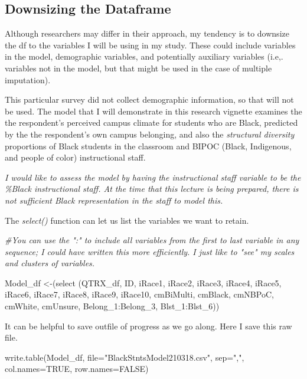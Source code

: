 \documentclass[
  english,
]{book}
\newenvironment{Shaded}{\begin{snugshade}}{\end{snugshade}}
\newcommand{\AttributeTok}[1]{\textcolor[rgb]{0.77,0.63,0.00}{#1}}
\newcommand{\CommentTok}[1]{\textcolor[rgb]{0.56,0.35,0.01}{\textit{#1}}}
\newcommand{\ConstantTok}[1]{\textcolor[rgb]{0.00,0.00,0.00}{#1}}
\newcommand{\FunctionTok}[1]{\textcolor[rgb]{0.00,0.00,0.00}{#1}}
\newcommand{\NormalTok}[1]{#1}
\newcommand{\OtherTok}[1]{\textcolor[rgb]{0.56,0.35,0.01}{#1}}
\newcommand{\SpecialCharTok}[1]{\textcolor[rgb]{0.00,0.00,0.00}{#1}}
\newcommand{\StringTok}[1]{\textcolor[rgb]{0.31,0.60,0.02}{#1}}
\begin{document}
\hypertarget{downsizing-the-dataframe}{%
\subsection{Downsizing the Dataframe}\label{downsizing-the-dataframe}}

Although researchers may differ in their approach, my tendency is to downsize the df to the variables I will be using in my study. These could include variables in the model, demographic variables, and potentially auxiliary variables (i.e,. variables not in the model, but that might be used in the case of multiple imputation).

This particular survey did not collect demographic information, so that will not be used. The model that I will demonstrate in this research vignette examines the the respondent's perceived campus climate for students who are Black, predicted by the the respondent's own campus belonging, and also the \emph{structural diversity} \citep{lewis_black_2019} proportions of Black students in the classroom and BIPOC (Black, Indigenous, and people of color) instructional staff.

\emph{I would like to assess the model by having the instructional staff variable to be the \%Black instructional staff. At the time that this lecture is being prepared, there is not sufficient Black representation in the staff to model this.}

The \emph{select()} function can let us list the variables we want to retain.

\begin{Shaded}
\begin{Highlighting}[]
\CommentTok{\#You can use the ":" to include all variables from the first to last variable in any sequence; I could have written this more efficiently.  I just like to "see" my scales and clusters of variables.}

\NormalTok{Model\_df }\OtherTok{\textless{}{-}}\NormalTok{(}\FunctionTok{select}\NormalTok{ (QTRX\_df, ID, iRace1, iRace2, iRace3, iRace4, iRace5, iRace6, iRace7, iRace8, iRace9, iRace10, cmBiMulti, cmBlack, cmNBPoC, cmWhite, cmUnsure, Belong\_1}\SpecialCharTok{:}\NormalTok{Belong\_3, Blst\_1}\SpecialCharTok{:}\NormalTok{Blst\_6))}
\end{Highlighting}
\end{Shaded}

It can be helpful to save outfile of progress as we go along. Here I save this raw file.

\begin{Shaded}
\begin{Highlighting}[]
\FunctionTok{write.table}\NormalTok{(Model\_df, }\AttributeTok{file=}\StringTok{"BlackStntsModel210318.csv"}\NormalTok{, }\AttributeTok{sep=}\StringTok{","}\NormalTok{, }\AttributeTok{col.names=}\ConstantTok{TRUE}\NormalTok{, }\AttributeTok{row.names=}\ConstantTok{FALSE}\NormalTok{)}
\end{Highlighting}
\end{Shaded}
\end{document}
